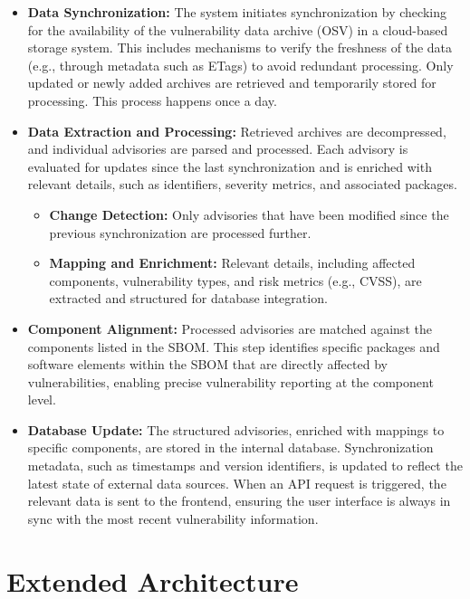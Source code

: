 \begin{itemize}
    \item \textbf{Data Synchronization:} The system initiates synchronization by checking for the availability of the vulnerability data archive (\ac{OSV}) in a cloud-based storage system. This includes mechanisms to verify the freshness of the data (e.g., through metadata such as ETags) to avoid redundant processing. Only updated or newly added archives are retrieved and temporarily stored for processing. This process happens once a day.

    \item \textbf{Data Extraction and Processing:} Retrieved archives are decompressed, and individual advisories are parsed and processed. Each advisory is evaluated for updates since the last synchronization and is enriched with relevant details, such as identifiers, severity metrics, and associated packages. 
    \begin{itemize}
        \item \textbf{Change Detection:} Only advisories that have been modified since the previous synchronization are processed further.
        \item \textbf{Mapping and Enrichment:} Relevant details, including affected components, vulnerability types, and risk metrics (e.g., \ac{CVSS}), are extracted and structured for database integration.
    \end{itemize}

    \item \textbf{Component Alignment:} Processed advisories are matched against the components listed in the \ac{SBOM}. This step identifies specific packages and software elements within the \ac{SBOM} that are directly affected by vulnerabilities, enabling precise vulnerability reporting at the component level.

    \item \textbf{Database Update:} The structured advisories, enriched with mappings to specific components, are stored in the internal database. Synchronization metadata, such as timestamps and version identifiers, is updated to reflect the latest state of external data sources. When an \ac{API} request is triggered, the relevant data is sent to the frontend, ensuring the user interface is always in sync with the most recent vulnerability information.
\end{itemize}

\section{Extended Architecture}
\label{sec:extended-architecture}

